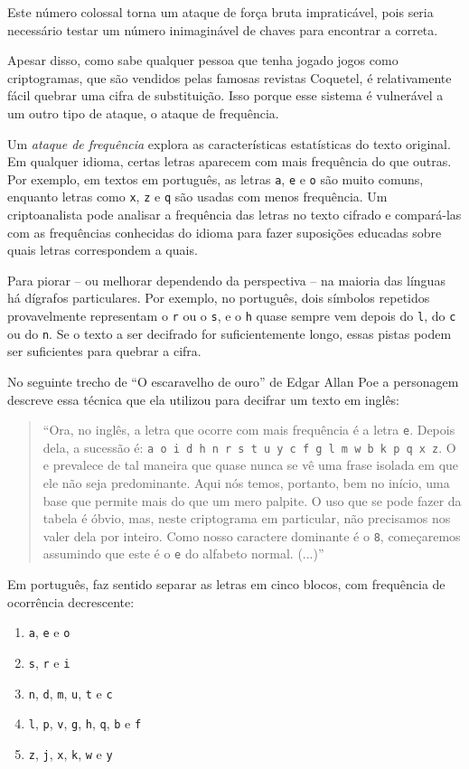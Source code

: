 Este número colossal torna um ataque de força bruta impraticável, pois seria necessário testar um número inimaginável de chaves para encontrar a correta.

Apesar disso, como sabe qualquer pessoa que tenha jogado jogos como criptogramas, que são vendidos pelas famosas revistas Coquetel, é relativamente fácil quebrar uma cifra de substituição.
Isso porque esse sistema é vulnerável a um outro tipo de ataque, o ataque de frequência.

Um {\em ataque de frequência} explora as características estatísticas do texto original.
Em qualquer idioma, certas letras aparecem com mais frequência do que outras.
Por exemplo, em textos em português, as letras {\tt a}, {\tt e} e {\tt o} são muito comuns, enquanto letras como {\tt x}, {\tt z} e {\tt q} são usadas com menos frequência.
Um criptoanalista pode analisar a frequência das letras no texto cifrado e compará-las com as frequências conhecidas do idioma para fazer suposições educadas sobre quais letras correspondem a quais.

Para piorar -- ou melhorar dependendo da perspectiva -- na maioria das línguas há dígrafos particulares.
Por exemplo, no português, dois símbolos repetidos provavelmente representam o {\tt r} ou o {\tt s}, e o {\tt h} quase sempre vem depois do {\tt l}, do {\tt c} ou do {\tt n}.
Se o texto a ser decifrado for suficientemente longo, essas pistas podem ser suficientes para quebrar a cifra.

No seguinte trecho de ``O escaravelho de ouro'' de Edgar Allan Poe a personagem descreve essa técnica que ela utilizou para decifrar um texto em inglês:

\begin{quote}
``Ora, no inglês, a letra que ocorre com mais frequência é a letra {\tt e}.
Depois dela, a sucessão é: {\tt a o i d h n r s t u y c f g l m w b k p q x z}.
O e prevalece de tal maneira que quase nunca se vê uma frase isolada em que ele não seja predominante.
Aqui nós temos, portanto, bem no início, uma base que permite mais do que um mero palpite.
O uso que se pode fazer da tabela é óbvio, mas, neste criptograma em particular, não precisamos nos valer dela por inteiro.
Como nosso caractere dominante é o {\tt 8}, começaremos assumindo que este é o {\tt e} do alfabeto normal. (...)''
\end{quote}

Em português, faz sentido separar as letras em cinco blocos, com frequência de ocorrência decrescente:
\begin{enumerate}
\item {\tt a}, {\tt e} e {\tt o}
\item {\tt s}, {\tt r} e {\tt i}
\item {\tt n}, {\tt d}, {\tt m}, {\tt u}, {\tt t} e {\tt c}
\item {\tt l}, {\tt p}, {\tt v}, {\tt g}, {\tt h}, {\tt q}, {\tt b} e {\tt f}
\item {\tt z}, {\tt j}, {\tt x}, {\tt k}, {\tt w} e {\tt y}
\end{enumerate}

